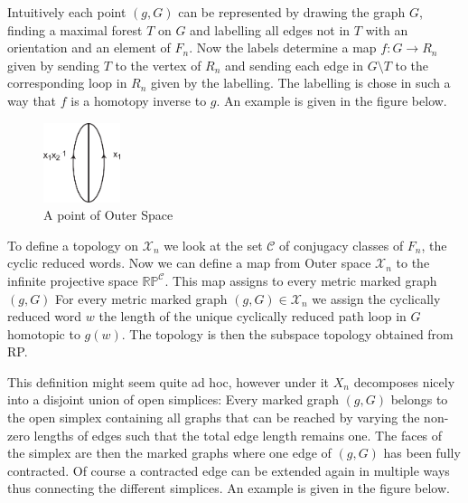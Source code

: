 Intuitively each point $(g,G)$ can be represented by drawing the graph $G$,
finding a maximal forest $T$ on $G$ and labelling all edges not in $T$ with an orientation
and an element of $F_{n}$.
Now the labels determine a map $f: G \to R_{n}$ given by sending $T$ to the vertex of $R_{n}$ and sending
each edge in $G \setminus T$ to the corresponding loop in $R_{n}$ given by the labelling.
The labelling is chose in such a way that $f$ is a homotopy inverse to $g$.
An example is given in the figure below.
\begin{figure}[h]
	\centering
	\includegraphics[width=0.2\textwidth]{./Images/pointOfOuterSpace.pdf}
	\caption{A point of Outer Space}
\end{figure}

To define a topology on $\mathcal{X}_{n}$ we look at the set $\mathcal{C}$ of conjugacy classes of $F_{n}$, the cyclic reduced words.
Now we can define a map from Outer space $\mathcal{X}_{n}$ to the infinite projective space $\mathbb{RP}^{\mathcal{C}}$.
This map assigns to every metric marked graph $(g,G)$
For every metric marked graph $(g,G) \in \mathcal{X}_{n}$ we assign the cyclically reduced word $w$
the length of the unique cyclically reduced path loop in $G$ homotopic to $g(w)$.
The topology is then the subspace topology obtained from RP.

This definition might seem quite ad hoc, however under it $X_{n}$ decomposes nicely into
a disjoint union of open simplices: Every marked graph $(g,G)$ belongs to the open simplex
containing all graphs that can be reached by varying the non-zero lengths of edges such that
the total edge length remains one. The faces of the simplex are then the marked graphs where one edge of $(g,G)$
has been fully contracted. Of course a contracted edge can be extended again in multiple ways thus connecting
the different simplices. An example is given in the figure below.

